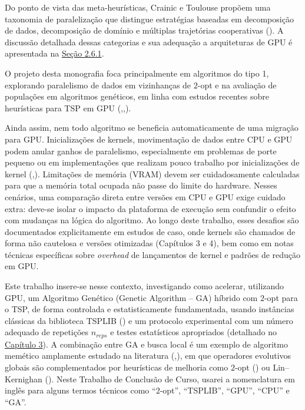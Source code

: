 Do ponto de vista das meta-heurísticas, Crainic e Toulouse propõem uma
taxonomia de paralelização que distingue estratégias baseadas em
decomposição de dados, decomposição de domínio e múltiplas trajetórias
cooperativas (). A discussão
detalhada dessas categorias e sua adequação a arquiteturas de GPU é
apresentada na \hyperref[sec-261-taxonomia-paralelizacao]{Seção 2.6.1}.

O projeto desta monografia foca principalmente em algoritmos do tipo 1,
explorando paralelismo de dados em vizinhanças de \(2\)-opt e na
avaliação de populações em algoritmos genéticos, em linha com estudos
recentes sobre heurísticas para TSP em GPU
(,,).

Ainda assim, nem todo algoritmo se beneficia automaticamente de uma
migração para GPU. Inicializações de kernels, movimentação de dados
entre CPU e GPU podem anular ganhos de paralelismo, especialmente em
problemas de porte pequeno ou em implementações que realizam pouco
trabalho por inicializações de kernel
(,).
Limitações de memória (VRAM) devem ser cuidadosamente calculadas para
que a memória total ocupada não passe do limite do hardware. Nesses
cenários, uma comparação direta entre versões em CPU e GPU exige cuidado
extra: deve-se isolar o impacto da plataforma de execução sem confundir
o efeito com mudanças na lógica do algoritmo. Ao longo deste trabalho,
esses desafios são documentados explicitamente em estudos de caso, onde
kernels são chamados de forma não cautelosa e versões otimizadas
(Capítulos 3 e 4), bem como em notas técnicas específicas sobre
\emph{overhead} de lançamentos de kernel e padrões de redução em GPU.

Este trabalho insere-se nesse contexto, investigando como acelerar,
utilizando GPU, um Algoritmo Genético (Genetic Algorithm -- GA) híbrido
com \(2\)-opt para o TSP, de forma controlada e estatisticamente
fundamentada, usando instâncias clássicas da biblioteca TSPLIB
() e um protocolo experimental com
um número adequado de repetições \(n_{reps}\) e testes estatísticos
apropriados (detalhado no \hyperref[cap3-materiais-metodos]{Capítulo
3}). A combinação entre GA e busca local é um exemplo de algoritmo
memético amplamente estudado na literatura
(,),
em que operadores evolutivos globais são complementados por heurísticas
de melhoria como \(2\)-opt () ou
Lin--Kernighan (). Neste Trabalho de
Conclusão de Curso, usarei a nomenclatura em inglês para alguns termos
técnicos como ``\(2\)-opt'', ``TSPLIB'', ``GPU'', ``CPU'' e ``GA''.


